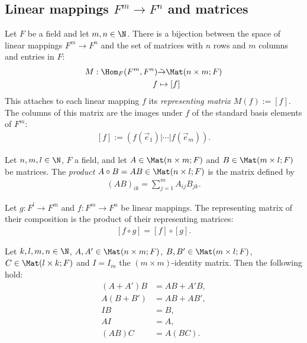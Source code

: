 \documentclass{article}
\begin{document}
\subsection{Linear mappings $F^m\to F^n$ and matrices}

\begin{theorem}[Notes 2.1.1]
    Let $F$ be a field and let $m,n\in\N$. There is a bijection between the space of
    linear mappings $F^m\to F^n$ and the set of matrices with $n$ rows and $m$
    columns and entries in $F$:
    \begin{align*}
        M:\Hom_F(F^m,F^n) & \tilde\to\Mat(n\times m; F) \\
        f                 & \mapsto  \left[f\right]
    \end{align*}
    This attaches to each linear mapping $f$ its \emph{representing matrix
        $M(f):=\left[f\right]$}. The columns of this matrix are the images under $f$
    of the standard basis elements of $F^m$:
    \begin{align*}
        \left[f\right]:=(f(\vec e_1)|\cdots|f(\vec e_m)).
    \end{align*}
\end{theorem}

\begin{definition}
    Let $n,m,l\in\N$, $F$ a field, and let $A\in\Mat(n\times m; F)$ and
    $B\in\Mat(m\times l; F)$ be matrices. The \emph{product}
    $A\circ B=AB\in\Mat(n\times l; F)$ is the matrix defined by
    \begin{align*}
        (AB)_{ik} = \sum_{j=1}^m A_{ij}B_{jk}.
    \end{align*}
\end{definition}

\begin{theorem}[Notes 2.1.8]
    Let $g:F^l\to F^m$ and $f:F^m\to F^n$ be linear mappings. The representing matrix
    of their composition is the product of their representing matrices:
    \begin{align*}
        \left[f\circ g\right]=\left[f\right]\circ\left[g\right].
    \end{align*}
\end{theorem}

\begin{proposition}[Notes 2.1.9]
    Let $k,l,m,n\in\N$, $A,A'\in\Mat(n\times m;F)$, $B,B'\in\Mat(m\times l;F)$,
    $C\in\Mat(l\times k; F)$ and $I=I_m$ the $(m\times m)$-identity matrix.
    Then the following hold:
    \begin{align*}
        (A+A')B & = AB + A'B, \\
        A(B+B') & = AB + AB', \\
        IB      & = B,        \\
        AI      & = A,        \\
        (AB)C   & = A(BC).
    \end{align*}
\end{proposition}
\end{document}
